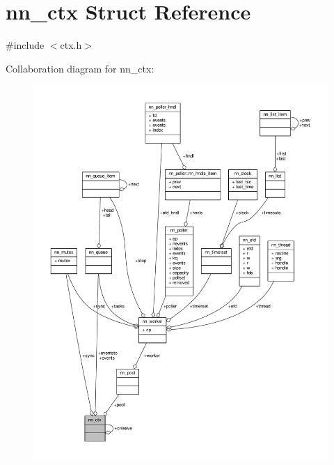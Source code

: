 \hypertarget{structnn__ctx}{}\section{nn\+\_\+ctx Struct Reference}
\label{structnn__ctx}


{\ttfamily \#include $<$ctx.\+h$>$}



Collaboration diagram for nn\+\_\+ctx\+:\nopagebreak
\begin{figure}[H]
\begin{center}
\leavevmode
\includegraphics[width=350pt]{structnn__ctx__coll__graph}
\end{center}
\end{figure}
